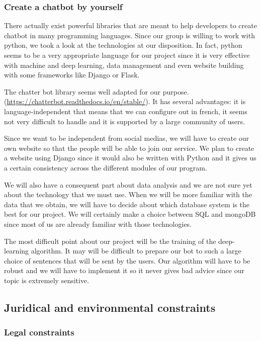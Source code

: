 \documentclass{article}
\begin{document}
\subsubsection{Create a chatbot by yourself}

There actually exist powerful libraries that are meant to help developers to create chatbot in many programming 
languages. Since our group is willing to work with python, we took a look at the technologies at our disposition. In fact, 
python seems to be a very appropriate language for our project since it is very effective with machine and deep learning, data management and even website building with some frameworks like Django or Flask.

The chatter bot library seems well adapted for our purpose. (\url{https://chatterbot.readthedocs.io/en/stable/}). It has several advantages: it is language-independent that means that we can configure out in french, it seems not very difficult to handle and it is supported by a large community of users.

Since we want to be independent from social medias, we will have to create our own website so that the people will
be able to join our service. We plan to create a website using Django since it would also be written with Python and it
gives us a certain consistency across the different modules of our program.

We will also have a consequent part about data analysis and we are not sure yet about the technology that we must use.
When we will be more familiar with the data that we obtain, we will have to decide about which database system is the best for our project. We will certainly make a choice between SQL and mongoDB since most of us are already familiar with those technologies.

The most difficult point about our project will be the training of the deep-learning algorithm. It may will be difficult to prepare our bot to such a large choice of sentences that will be sent by the users. Our algorithm will have to be robust and we will have to implement it so it never gives bad advice since our topic is extremely sensitive.

\subsection{Juridical and environmental constraints}

\subsubsection{Legal constraints}
\end{document}
